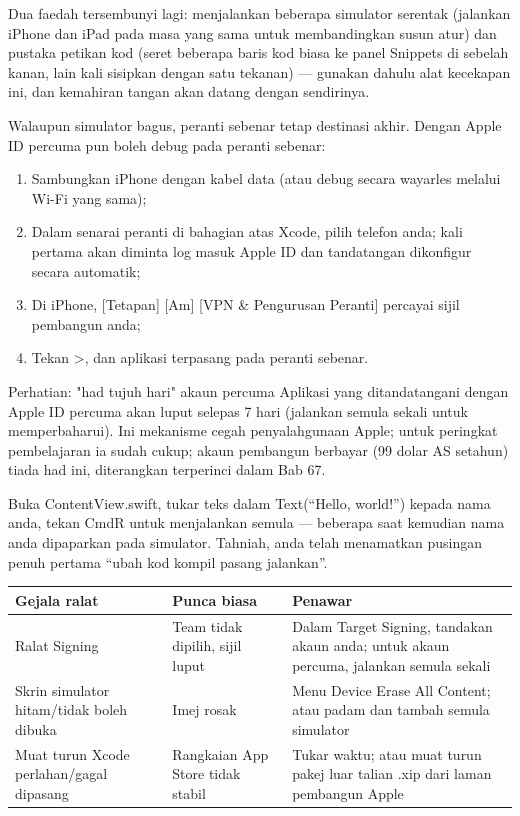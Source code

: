 Dua faedah tersembunyi lagi: menjalankan beberapa simulator serentak (jalankan iPhone dan iPad pada masa yang sama untuk membandingkan susun atur) dan pustaka petikan kod (seret beberapa baris kod biasa ke panel Snippets di sebelah kanan, lain kali sisipkan dengan satu tekanan) — gunakan dahulu alat kecekapan ini, dan kemahiran tangan akan datang dengan sendirinya.


Walaupun simulator bagus, peranti sebenar tetap destinasi akhir. Dengan Apple ID percuma pun boleh debug pada peranti sebenar:

\begin{enumerate}
  \item Sambungkan iPhone dengan kabel data (atau debug secara wayarles melalui Wi-Fi yang sama);
  \item Dalam senarai peranti di bahagian atas Xcode, pilih telefon anda; kali pertama akan diminta log masuk Apple ID dan tandatangan dikonfigur secara automatik;
  \item Di iPhone, [Tetapan] [Am] [VPN \& Pengurusan Peranti] percayai sijil pembangun anda;
  \item Tekan >, dan aplikasi terpasang pada peranti sebenar.
\end{enumerate}

\begin{tcbwarn}{Perhatian: "had tujuh hari" akaun percuma}
Aplikasi yang ditandatangani dengan Apple ID percuma akan luput selepas 7 hari (jalankan semula sekali untuk memperbaharui). Ini mekanisme cegah penyalahgunaan Apple; untuk peringkat pembelajaran ia sudah cukup; akaun pembangun berbayar (99 dolar AS setahun) tiada had ini, diterangkan terperinci dalam Bab 67.

\end{tcbwarn}



Buka ContentView.swift, tukar teks dalam Text(“Hello, world!”) kepada nama anda, tekan CmdR untuk menjalankan semula — beberapa saat kemudian nama anda dipaparkan pada simulator. Tahniah, anda telah menamatkan pusingan penuh pertama “ubah kod kompil pasang jalankan”.

\begin{center}
\begin{tabularx}{\linewidth}{|X|X|X|}
\hline
\textbf{Gejala ralat} & \textbf{Punca biasa} & \textbf{Penawar} \tabularnewline
\hline
Ralat Signing & Team tidak dipilih, sijil luput & Dalam Target Signing, tandakan akaun anda; untuk akaun percuma, jalankan semula sekali \tabularnewline
Skrin simulator hitam/tidak boleh dibuka & Imej rosak & Menu Device Erase All Content; atau padam dan tambah semula simulator \tabularnewline
Muat turun Xcode perlahan/gagal dipasang & Rangkaian App Store tidak stabil & Tukar waktu; atau muat turun pakej luar talian .xip dari laman pembangun Apple \tabularnewline
\hline
\end{tabularx}
\end{center}

